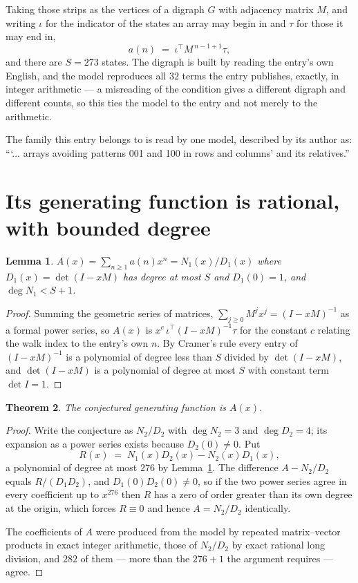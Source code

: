 \documentclass[11pt,a4paper]{article}
\theoremstyle{plain}
\newtheorem{theorem}{Theorem}
\newtheorem{lemma}[theorem]{Lemma}
\theoremstyle{definition}
\begin{document}
Taking those strips as the vertices of a digraph $G$ with adjacency matrix $M$, and writing
$\iota$ for the indicator of the states an array may begin in and $\tau$ for those it may end
in,
\[
a(n)\;=\;\iota^{\!\top}M^{\,n-1+1}\tau ,
\]
and there are $S=273$ states. The digraph is built by reading the entry's own English, and the
model reproduces all $32$ terms the entry publishes, exactly, in integer arithmetic --- a
misreading of the condition gives a different digraph and different counts, so this ties the
model to the entry and not merely to the arithmetic.

The family this entry belongs to is read by one model, described by its author as: ```... arrays avoiding patterns 001 and 100 in rows and columns' and its relatives.''


\section{Its generating function is rational, with bounded degree}

\begin{lemma}\label{lem:rat}
$A(x)=\sum_{n\ge1}a(n)x^n=N_1(x)/D_1(x)$ where $D_1(x)=\det(I-xM)$ has degree at most
$S$ and $D_1(0)=1$, and $\deg N_1<S+1$.
\end{lemma}

\begin{proof}
Summing the geometric series of matrices, $\sum_{j\ge0}M^jx^j=(I-xM)^{-1}$ as a formal
power series, so $A(x)$ is $x^{c}\,\iota^{\!\top}(I-xM)^{-1}\tau$ for the constant $c$
relating the walk index to the entry's own $n$. By Cramer's rule every entry of
$(I-xM)^{-1}$ is a polynomial of degree less than $S$ divided by $\det(I-xM)$, and
$\det(I-xM)$ is a polynomial of degree at most $S$ with constant term $\det I=1$.
\end{proof}

\begin{theorem}
The conjectured generating function is $A(x)$.
\end{theorem}

\begin{proof}
Write the conjecture as $N_2/D_2$ with $\deg N_2=3$ and $\deg D_2=4$; its expansion as a
power series exists because $D_2(0)\neq0$. Put
\[
R(x)\;=\;N_1(x)D_2(x)-N_2(x)D_1(x),
\]
a polynomial of degree at most $276$ by Lemma~\ref{lem:rat}. The difference
$A-N_2/D_2$ equals $R/(D_1D_2)$, and $D_1(0)D_2(0)\neq0$, so if the two power series agree in
every coefficient up to $x^{276}$ then $R$ has a zero of order greater than its own
degree at the origin, which forces $R\equiv0$ and hence $A=N_2/D_2$ identically.

The coefficients of $A$ were produced from the model by repeated matrix--vector products in
exact integer arithmetic, those of $N_2/D_2$ by exact rational long division, and $282$
of them --- more than the $276+1$ the argument requires --- agree.
\end{proof}
\end{document}
